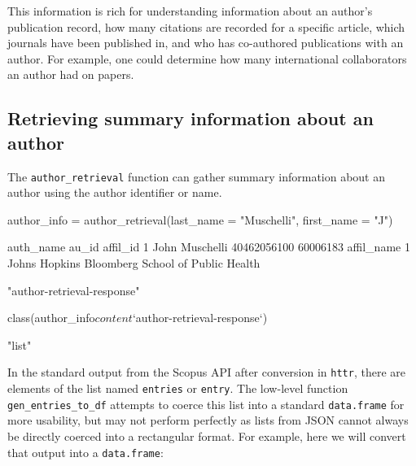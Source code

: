 This information is rich for understanding information about an author's
publication record, how many citations are recorded for a specific
article, which journals have been published in, and who has co-authored
publications with an author. For example, one could determine how many
international collaborators an author had on papers.

\hypertarget{retrieving-summary-information-about-an-author}{%
\subsection{Retrieving summary information about an
author}\label{retrieving-summary-information-about-an-author}}

The \texttt{author\_retrieval} function can gather summary information
about an author using the author identifier or name.

\begin{Schunk}
\begin{Sinput}
author_info = author_retrieval(last_name = "Muschelli", first_name = "J")
\end{Sinput}
\begin{Soutput}
       auth_name       au_id affil_id
1 John Muschelli 40462056100 60006183
                                       affil_name
1 Johns Hopkins Bloomberg School of Public Health
\end{Soutput}
\begin{Soutput}
[1] "author-retrieval-response"
\end{Soutput}
\begin{Sinput}
class(author_info$content$`author-retrieval-response`)
\end{Sinput}
\begin{Soutput}
[1] "list"
\end{Soutput}
\end{Schunk}

In the standard output from the Scopus API after conversion in
\texttt{httr}, there are elements of the list named \texttt{entries} or
\texttt{entry}. The low-level function \texttt{gen\_entries\_to\_df}
attempts to coerce this list into a standard \texttt{data.frame} for
more usability, but may not perform perfectly as lists from JSON cannot
always be directly coerced into a rectangular format. For example, here
we will convert that output into a \texttt{data.frame}:

